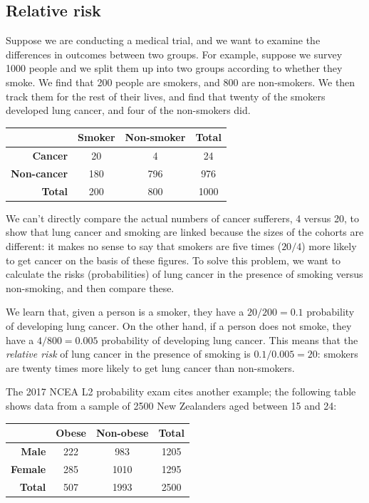\subsection*{Relative risk}

Suppose we are conducting a medical trial, and we want to examine the differences in outcomes between two groups. For example,
suppose we survey 1000 people and we split them up into two groups according to whether they smoke. We find that 200 people
are smokers, and 800 are non-smokers. We then track them for the rest of their lives, and find that twenty of the smokers
developed lung cancer, and four of the non-smokers did.

\begin{tabular}{|r|c|c|c|}\hline
  & \textbf{Smoker} & \textbf{Non-smoker} & \textbf{Total}\\\hline
  \textbf{Cancer} &20&4&24\\\hline
  \textbf{Non-cancer} &180& 796 & 976 \\\hline
  \textbf{Total} &200&800&1000\\\hline
\end{tabular}

We can't directly compare the actual numbers of cancer sufferers, 4 versus 20, to show that lung cancer and smoking are linked
because the sizes of the cohorts are different: it makes no sense to say that smokers are five times ($ 20/4$) more likely to get cancer
on the basis of these figures. To solve this problem, we want to calculate the risks (probabilities) of lung cancer in the presence
of smoking versus non-smoking, and then compare these.

We learn that, given a person is a smoker, they have a $ 20/200 = 0.1 $ probability of developing
lung cancer. On the other hand, if a person does not smoke, they have a $ 4/800 = 0.005 $ probability
of developing lung cancer. This means that the \emph{relative risk} of lung cancer in the presence
of smoking is $ 0.1/0.005 = 20 $: smokers are twenty times more likely to get lung cancer than non-smokers.

The 2017 NCEA L2 probability exam cites another example; the following table shows data from a sample
of 2500 New Zealanders aged between 15 and 24:

\begin{tabular}{|r|c|c|c|}\hline
  & \textbf{Obese} & \textbf{Non-obese} & \textbf{Total}\\\hline
  \textbf{Male} &222&983&1205\\\hline
  \textbf{Female} &285& 1010 & 1295 \\\hline
  \textbf{Total} &507&1993&2500\\\hline
\end{tabular}

